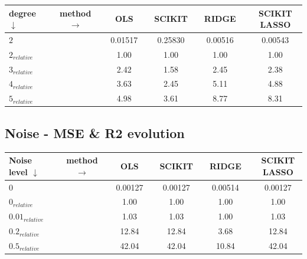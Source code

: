 \begin{center}
\label{tab:time-test}
\begin{tabularx}{\textwidth}{l X c X c X c X c X c}
    \hline
    \hline
        degree $\downarrow$ && method $\rightarrow$ && OLS && SCIKIT && RIDGE && SCIKIT LASSO\\
    \hline
        $2  $             && &&   0.01517 &&	0.25830	&&	0.00516      && 0.00543		\\
        $2_{relative}$   	&& &&   1.00   	&&	1.00 	&&	1.00         &&	1.00	\\
        $3_{relative}$   	&& &&   2.42   	&&	1.58	&&	2.45         &&	2.38	\\
        $4_{relative}$   	&& &&   3.63   	&&	2.45	&&	5.11         &&	4.88	\\
        $5_{relative}$   	&& &&   4.98   	&&	3.61	&&	8.77         &&	8.31	\\
    \hline
\end{tabularx}
\end{center}

\subsection{Noise - MSE \& R2 evolution}

\begin{center}
\label{tab:noise-test-MSE}
\begin{tabularx}{\textwidth}{l X c X c X c X c X c}
    \hline
    \hline
        Noise level $\downarrow$ && method $\rightarrow$ && OLS && SCIKIT && RIDGE && SCIKIT LASSO\\
    \hline
        $0  $               && &&   0.00127     &&	0.00127	  &&	0.00514      && 0.00127		\\
        $0_{relative}$   	&& &&   1.00   	    &&	1.00 	  &&	1.00         &&	1.00	\\
        $0.01_{relative}$   && &&   1.03   	    &&	1.03	  &&	1.00         &&	1.03	\\
        $0.2_{relative}$   	&& &&   12.84   	&&	12.84	  &&	3.68         &&	12.84	\\
        $0.5_{relative}$   	&& &&   42.04   	&&	42.04	  &&	10.84        &&	42.04	\\
    \hline
\end{tabularx}
\end{center}

